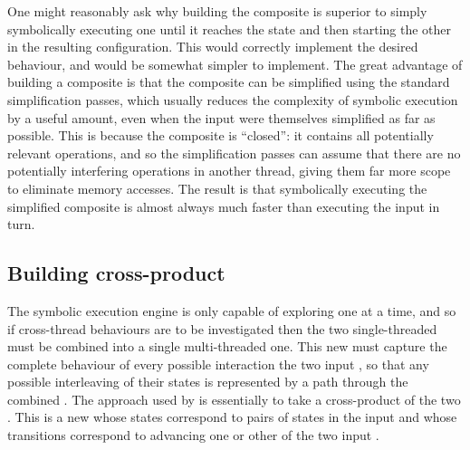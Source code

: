 One might reasonably ask why building the composite {\StateMachine} is
superior to simply symbolically executing one {\StateMachine} until it
reaches the {\stSurvive} state and then starting the other
{\StateMachine} in the resulting configuration.  This would correctly
implement the desired behaviour, and would be somewhat simpler to
implement.  The great advantage of building a composite
{\StateMachine} is that the composite {\StateMachine} can be
simplified using the standard {\StateMachine} simplification passes,
which usually reduces the complexity of symbolic execution by a useful
amount, even when the input {\StateMachines} were themselves
simplified as far as possible.  This is because the composite
{\StateMachine} is ``closed'': it contains all potentially relevant
operations, and so the simplification passes can assume that there are
no potentially interfering operations in another thread, giving them
far more scope to eliminate memory accesses.  The result is that
symbolically executing the simplified composite {\StateMachine} is
almost always much faster than executing the input {\StateMachines} in
turn.  

\subsection{Building cross-product {\StateMachines}}
\label{sect:using:build_cross_product}

The symbolic execution engine is only capable of exploring one
{\StateMachine} at a time, and so if cross-thread behaviours are to be
investigated then the two single-threaded {\StateMachines} must be
combined into a single multi-threaded one.  This new {\StateMachine}
must capture the complete behaviour of every possible interaction the
two input {\StateMachines}, so that any possible interleaving of their
states is represented by a path through the combined {\StateMachine}.
The approach used by {\technique} is essentially to take a
cross-product of the two {\StateMachines}.  This is a new
{\StateMachine} whose states correspond to pairs of states in the
input {\StateMachine} and whose transitions correspond to advancing
one or other of the two input {\StateMachines}.

